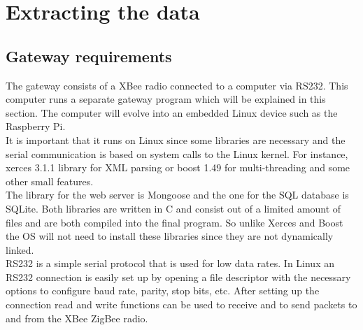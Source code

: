 \section{Extracting the data}
\label{extracting}
\subsection{Gateway requirements}
The gateway consists of a XBee radio connected to a computer via RS232. This computer runs a separate gateway program which will be explained in this section. The computer will evolve into an embedded Linux device such as the Raspberry Pi.\\
It is important that it runs on Linux since some libraries are necessary and the serial communication is based on system calls to the Linux kernel. For instance, xerces 3.1.1 library for XML parsing or boost 1.49 for multi-threading and some other small features.\\
The library for the web server is Mongoose and the one for the SQL database is SQLite. Both libraries are written in C and consist out of a limited amount of files and are both compiled into the final program. So unlike Xerces and Boost the OS will not need to install these libraries since they are not dynamically linked.\\
RS232 is a simple serial protocol that is used for low data rates. In Linux an RS232 connection is easily set up by opening a file descriptor with the necessary options to configure baud rate, parity, stop bits, etc\citep{SWEET}. After setting up the connection read and write functions can be used to receive and to send packets to and from the XBee ZigBee radio.

